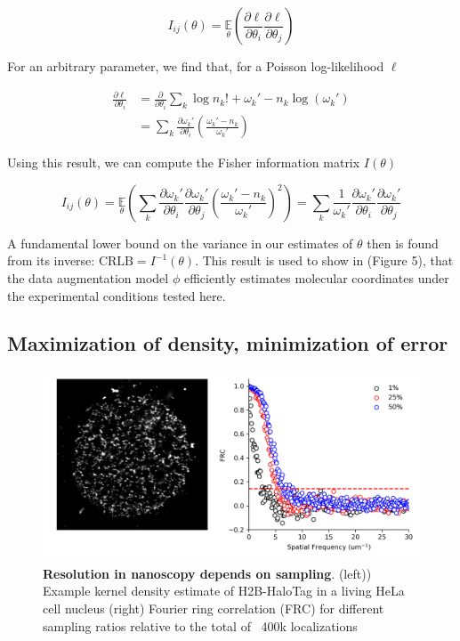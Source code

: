 \begin{equation}
I_{ij}(\theta) = \underset{\theta}{\mathbb{E}}\left(\frac{\partial \ell}{\partial\theta_{i}}\frac{\partial\ell}{\partial\theta_{j}}\right) 
\end{equation}

For an arbitrary parameter, we find that, for a Poisson log-likelihood $\ell$

\begin{align*}
\frac{\partial \ell}{\partial \theta_{i}} &= \frac{\partial}{\partial \theta_{i}} \sum_{k}  \log n_{k}! + \omega_{k}' - n_{k}\log\left(\omega_{k}'\right)\\
&= \sum_{k} \frac{\partial \omega_{k}'}{\partial\theta_{i}} \left(\frac{\omega_{k}'-n_{k}}{\omega_{k}'}\right)
\end{align*}

Using this result, we can compute the Fisher information matrix $I(\theta)$

\begin{equation*}
I_{ij}(\theta) = \underset{\theta}{\mathbb{E}}\left(\sum_{k}\frac{\partial \omega_{k}'}{\partial\theta_{i}}\frac{\partial \omega_{k}'}{\partial\theta_{j}} \left(\frac{\omega_{k}'-n_{k}}{\omega_{k}'}\right)^{2}\right) = \sum_{k}\frac{1}{\omega_{k}'}\frac{\partial \omega_{k}'}{\partial\theta_{i}}\frac{\partial \omega_{k}'}{\partial\theta_{j}}
\end{equation*}

A fundamental lower bound on the variance in our estimates of $\theta$ then is found from its inverse: $\mathrm{CRLB} = I^{-1}(\theta)$. This result is used to show in (Figure 5), that the data augmentation model $\phi$ efficiently estimates molecular coordinates under the experimental conditions tested here. 



\subsection{Maximization of density, minimization of error}

\begin{figure}[t]
\begin{center}
\includegraphics[width=14cm]{media/FRC.png}
\end{center}
\caption{\textbf{Resolution in nanoscopy depends on sampling}. (left)) Example kernel density estimate of H2B-HaloTag in a living HeLa cell nucleus (right) Fourier ring correlation (FRC) for different sampling ratios relative to the total of ~400k localizations}
\end{figure}


